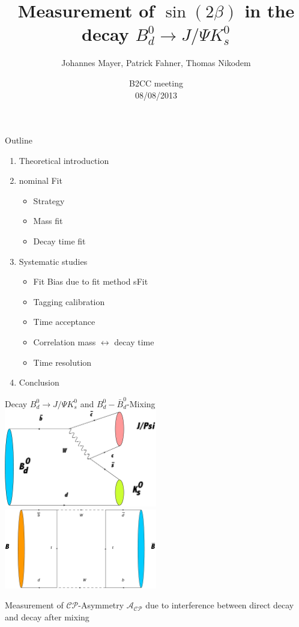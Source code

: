\documentclass{beamer}
\title[Measurement of $\sin(2\beta)$]{Measurement of $\sin(2\beta)$ in the decay $B_d^0 \longrightarrow J/\Psi K_s^0$}
\subtitle[]{}
\author[Johannes Mayer, Patrick Fahner, Thomas Nikodem]{Johannes Mayer, Patrick Fahner, Thomas Nikodem}
\institute[]{LHCb, Physikalisches Institut \\ Heidelberg University}
\date[08/08/13]{B2CC meeting \\ 08/08/2013}
\begin{document}
\setlength\abovedisplayskip{0pt}
	\begin{frame}[plain]
	\titlepage
	\end{frame}
	
	\begin{frame}{Outline}
	\begin{enumerate}
	\item Theoretical introduction
	\item nominal Fit
	    \begin{itemize}
	    \item Strategy
	    \item Mass fit
	    \item Decay time fit
	    \end{itemize}
	\item Systematic studies
		\begin{itemize}
		\item Fit Bias due to fit method sFit
	    \item Tagging calibration
	    \item Time acceptance
	    \item Correlation mass $\leftrightarrow$ decay time
	    \item Time resolution
    	\end{itemize}
	\item Conclusion
	\end{enumerate}
	\end{frame}
	
	\begin{frame}{Decay $B_d^0 \longrightarrow J/\Psi K_s^0$ and $B_d^0-\bar{B}_d^0$-Mixing}
	\includegraphics[width=0.5\textwidth]{Decay}
	\includegraphics[width=0.5\textwidth]{Mixing}
	\begin{center}
	\vspace{1.2cm}
	Measurement of $\mathcal{CP}$-Asymmetry $\mathcal{A_{CP}}$ due to interference between direct decay and decay after mixing
	\end{center}
	\end{frame}
\end{document}
